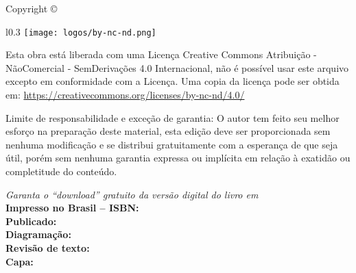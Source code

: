 
\newpage
\thispagestyle{empty}

\noindent Copyright \copyright\ \imprimiryear\ \myauthor %

\begin{wrapfigure}{l}{0.3\textwidth}
\vspace{-10pt}
\texttt{[image: logos/by-nc-nd.png]}
\vspace{-10pt}
\end{wrapfigure}
\noindent Esta obra está liberada com uma Licença 
Creative Commons Atribuição - NãoComercial - SemDerivações 4.0 Internacional,
não é possível usar este arquivo excepto em conformidade com a Licença. 
Uma copia da licença pode ser obtida em:
\url{https://creativecommons.org/licenses/by-nc-nd/4.0/} %


\noindent Limite de responsabilidade e exceção de garantia: O autor tem feito
seu melhor esforço na preparação deste material,
esta edição deve ser proporcionada sem nenhuma modificação e
se distribui gratuitamente com a esperança de que seja útil, 
porém sem nenhuma garantia expressa ou implícita em relação à exatidão ou completitude do conteúdo.

\noindent \textit{Garanta o ``download'' gratuito da versão digital do livro em \ImprimirLinkHomePageLivro}\\


\noindent \textbf{Impresso no Brasil -- ISBN:} \imprimirisbn\\ %
\noindent \textbf{Publicado:} \imprimireditora\\ %
\noindent \textbf{Diagramação:} \myauthor\\ %
\noindent \textbf{Revisão de texto:} \myauthor\\ %
\noindent \textbf{Capa:} \myauthor %

\vfill



\SetBookAuthorLastName{\myauthorlastname}
\SetBookAuthorName{\myauthorname}
\SetBookAuthorYearBorn{\myauthorborn}
\SetBookTitle{\mytitle}
\SetBookSubTitle{\mysubtitle}
\SetBookPublishingPlace{\imprimirlocal}
\SetBookPublishingEditor{\imprimireditora}
\SetBookPublishingYear{\imprimiryear}
\SetBookPaperSize{\imprimirpapersize}
\SetBookHasBibliography{\imprimirtipotrabalho}
\SetBookISBN{\imprimirisbn}
\SetBookKeyWordA{\palavraschavea}
\SetBookKeyWordB{\palavraschaveb}
\SetBookKeyWordC{\palavraschavec}
\SetBookCDD{\imprimirCDD}
\SetBookCDU{\imprimirCDU}
\begin{center}
\CatalographicCard{12.5cm}
\end{center}
\vfill



